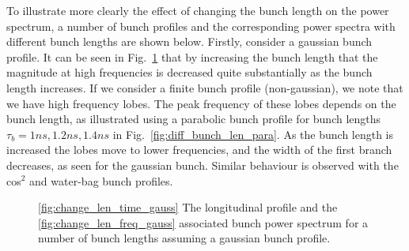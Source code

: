 To illustrate more clearly the effect of changing the bunch length on the power spectrum, a number of bunch profiles and the corresponding power spectra with different bunch lengths are shown below. Firstly, consider a gaussian bunch profile. It can be seen in Fig.~\ref{fig:diff_bunch_len_gauss} that by increasing the bunch length that the magnitude at high frequencies is decreased quite substantially as the bunch length increases. If we consider a finite bunch profile (non-gaussian), we note that we have high frequency lobes. The peak frequency of these lobes depends on the bunch length, as illustrated using a parabolic bunch profile for bunch lengths $\tau_{b} = 1ns, 1.2ns, 1.4ns$ in Fig.~\ref{fig:diff_bunch_len_para}. As the bunch length is increased the lobes move to lower frequencies, and the width of the first branch decreases, as seen for the gaussian bunch. Similar behaviour is observed with the cos$^{2}$ and water-bag bunch profiles.

\begin{figure}
\caption{\ref{fig:change_len_time_gauss} The longitudinal profile and the \ref{fig:change_len_freq_gauss} associated bunch power spectrum for a number of bunch lengths assuming a gaussian bunch profile.}
\label{fig:diff_bunch_len_gauss}
\end{figure}


